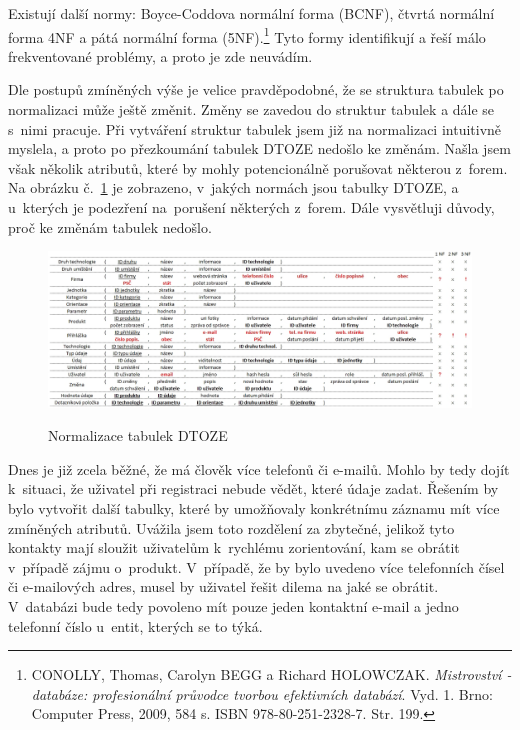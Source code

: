 \documentclass[11pt,a4paper]{article}
\begin{document}
Existují další normy: Boyce-Coddova normální forma (BCNF), čtvrtá normální forma 4NF a pátá normální forma (5NF).\footnote{CONOLLY, Thomas, Carolyn BEGG a Richard HOLOWCZAK. \textit{Mistrovství - databáze: profesionální průvodce tvorbou efektivních databází}. Vyd. 1. Brno: Computer Press, 2009, 584 s. ISBN 978-80-251-2328-7. Str. 199.} Tyto formy identifikují a řeší málo frekventované problémy, a proto je zde neuvádím.  

Dle postupů zmíněných výše je velice pravděpodobné, že se struktura tabulek po normalizaci může ještě změnit. Změny se zavedou do struktur tabulek a dále se s~nimi pracuje. Při vytváření struktur tabulek jsem již na normalizaci intuitivně myslela, a proto po přezkoumání tabulek DTOZE nedošlo ke změnám. Našla jsem však několik atributů, které by mohly potencionálně porušovat některou z~forem. Na obrázku č.~\ref{fig:DTOZE_log_C} je zobrazeno, v~jakých normách jsou tabulky DTOZE, a u~kterých je podezření na~porušení některých z~forem. Dále vysvětluji důvody, proč ke změnám tabulek nedošlo. 

\begin{figure}[H] 
\centering 
\caption{Normalizace tabulek DTOZE} 
\includegraphics[scale=0.4]{DTOZE_log_C} 
\label{fig:DTOZE_log_C}
\end{figure} 

Dnes je již zcela běžné, že má člověk více telefonů či e-mailů. Mohlo by tedy dojít k~situaci, že uživatel při registraci nebude vědět, které údaje zadat. Řešením by bylo vytvořit další tabulky, které by umožňovaly konkrétnímu záznamu mít více zmíněných atributů. Uvážila jsem toto rozdělení za zbytečné, jelikož tyto kontakty mají sloužit uživatelům k~rychlému zorientování, kam se obrátit v~případě zájmu o~produkt. V~případě, že by bylo uvedeno více telefonních čísel či e-mailových adres, musel by uživatel řešit dilema na jaké se obrátit. V~databázi bude tedy povoleno mít pouze jeden kontaktní e-mail a jedno telefonní číslo u~entit, kterých se to týká. 
\end{document}
